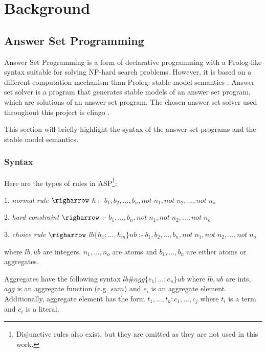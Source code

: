 \chapter{Background}


\section{Answer Set Programming}
\label{answer-set-programming}

Answer Set Programming  \cite{RefWorks:RefID:1-lifschitz2008answer} is a form of declarative programming with a Prolog-like syntax suitable for solving NP-hard search problems.
However, it is based on a different computation mechanism than Prolog: stable model semantics \cite{RefWorks:RefID:21-fitting1992michael}.
Answer set solver is a program that generates stable models of an answer set program, which are solutions of an answer set program. 
The chosen answer set solver used throughout this project is clingo \cite{RefWorks:RefID:22-clingo}.

This section will briefly highlight the syntax of the answer set programs and the stable model semantics.

\subsection{Syntax}

Here are the types of rules in ASP\footnote{Disjunctive rules also exist, but they are omitted as they are not used in this work.}: 

 1. \emph{normal rule} $\righarrow$ $ h\; \text{:-} \; b_1, b_2, ..., b_n, not\; n_1, not\; n_2, ..., not\; n_o$
 
 2. \emph{hard constraint} $\righarrow$ $\text{:-} \; b_1, ..., b_n, not\; n_1, not\; n_2, ..., not\; n_o$
 
 3. \emph{choice rule} $\righarrow$ $lb\{h_1; ..., h_m\}ub\; \text{:-} \;  b_1, b_2, ..., b_n, not\; n_1, not\; n_2, ..., not\; n_o$
 
where $lb, ub$ are integers, $n_1,...,n_o$ are atoms and $b_1, ...,b_n$ are either atoms or aggregates.

Aggregates have the following syntax $lb\#agg\{e_1; ...; e_n\}ub$ where $lb, ub$ are ints, $agg$ is an aggregate function (e.g. $sum$) and $e_i$ is an aggregate element.
Additionally, aggregate element has the form  $t_1, ..., t_k : c_1, ..., c_j$ where $t_i$ is a term and $c_i$ is a literal.
 
